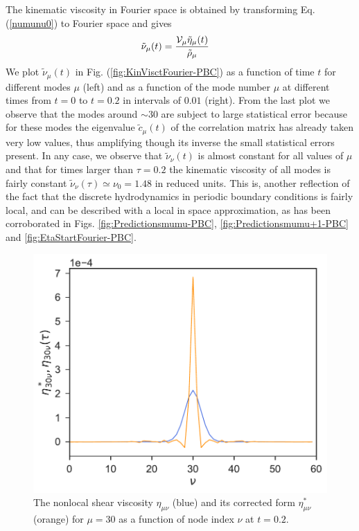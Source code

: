 \documentclass[b5paper,openright,11pt]{book}
\begin{document}
The kinematic viscosity  in Fourier space is  obtained by transforming Eq. (\ref{numunu0})
to Fourier space  and gives
\begin{align}
\tilde{\nu}_\mu(t)&=  \frac{{\cal V}_\mu \tilde{\eta}_\mu(t)}{\tilde{\rho}_\mu}
  \label{kinViscFourier}
\end{align}
We plot $\tilde{\nu}_\mu(t)$  in Fig.  (\ref{fig:KinVisctFourier-PBC}) as a  function of time
$t$ for  different modes  $\mu$ (left)  and as a  function of  the mode
number $\mu$  at different times from $t=0$ to $t=0.2$ in intervals of $0.01$ (right). From
the last plot  we observe that the modes around  $\sim 30$ are subject
to  large statistical  error because  for these  modes the  eigenvalue
$\tilde{c}_\mu(t)$ of  the correlation  matrix has already  taken very
low values, thus  amplifying though its inverse  the small statistical
errors present. In  any case, we observe  that $\tilde{\nu}_\nu(t)$ is
almost constant for all values of $\mu$ and that for times larger than
$\tau=0.2$ the  kinematic viscosity  of all  modes is  fairly constant
$\tilde{\nu}_\nu(\tau)\simeq\nu_0=1.48$  in  reduced units.  This  is,
another reflection  of the  fact that the  discrete hydrodynamics in 
periodic boundary conditions is fairly local, and can be described with
 a local in space approximation, as has been corroborated in Figs. 
 \ref{fig:Predictionsmumu-PBC}, \ref{fig:Predictionsmumu+1-PBC} and \ref{fig:EtaStartFourier-PBC}.


\begin{figure}[h!]
  \centering
\includegraphics[scale=0.41]{CompareEtas-PBC}
\caption[Comparison $\eta^*_{30,\nu}$ and $eta_{30,\nu}$]{The nonlocal shear viscosity $\eta_{\mu\nu}$ (blue) and its corrected form $\eta^*_{\mu\nu}$ (orange) for $\mu=30$ as a function of node index $\nu$ at $t=0.2$.}
\label{fig:CompareEtas-PBC}
\end{figure}
\end{document}
